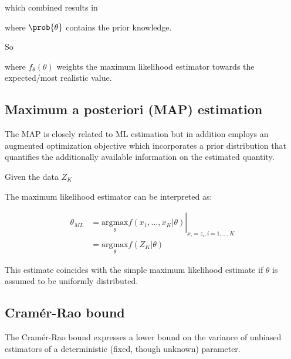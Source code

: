 \documentclass[10pt,a4paper]{scrartcl}
\begin{document}
\begin{multicols*}{2}


which combined results in


where $\prob{\theta}$ contains the prior knowledge.

So


where $f_\theta(\theta)$ weights the maximum likelihood estimator towards the expected/most realistic value.

\subsection{Maximum a posteriori (MAP) estimation}

The MAP is closely related to ML estimation but in addition employs an augmented optimization objective which incorporates a prior distribution that quantifies the additionally available information on the estimated quantity.

Given the data $Z_K$


The maximum likelihood estimator can be interpreted as:

\begin{align*}
\theta_{ML}&=\left.\underset{\theta}{\text{argmax}}f(x_1,\ldots,x_K|\theta)\right|_{x_i=z_i,i=1,\ldots,K}\\
&=\underset{\theta}{\text{argmax}}f(Z_K|\theta)
\end{align*}

This estimate coincides with the simple maximum likelihood estimate if $\theta$ is assumed to be uniformly distributed.

\subsection{Cramér-Rao bound}

The Cramér-Rao bound expresses a lower bound on the variance of unbiased estimators of a deterministic (fixed, though unknown) parameter.


\end{multicols*}
\end{document}
